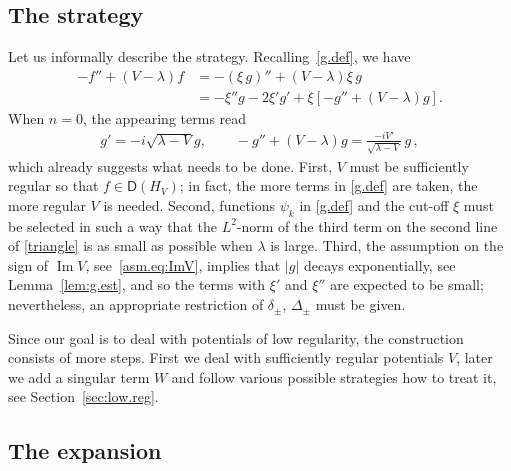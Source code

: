 \subsection{The strategy}
Let us informally describe the strategy. 
Recalling~\eqref{g.def}, we have
\begin{equation}\label{triangle}
\begin{aligned}
-f'' + (V-\lambda)f 
&= -(\xi \, g)'' + (V-\lambda)  \xi \, g
\\
&= -\xi'' g - 2 \xi' g' 
+ \xi [-g'' + (V-\lambda) g].
\end{aligned}
\end{equation}
When $n=0$, the appearing terms read
\begin{align}
g' 
= - i \sqrt{\lambda-V} g,
\qquad 
-g'' + (V-\lambda) g
= \frac{- iV'}{\sqrt{\lambda-V}} \, g
\,,
\end{align} 
which already suggests what needs to be done. First, $V$ must be sufficiently regular so that $f \in {\mathsf{D}}(H_V)$; in fact, the more terms in \eqref{g.def} are taken, the more regular $V$ is needed. Second, functions $\psi_k$ in \eqref{g.def}  and the cut-off $\xi$ must be selected in such a way that 
the $L^2$-norm of the third term on the second line of \eqref{triangle} 
is as small as possible when $\lambda$ is large. 
Third, the assumption on the sign of ${\operatorname{Im}} V$, 
see~\eqref{asm.eq:ImV}, implies that $|g|$ decays exponentially, see Lemma~\ref{lem:g.est}, and so the terms with $\xi'$ and $\xi''$ are expected to be small; nevertheless, an appropriate restriction of $\delta_\pm$, $\Delta_\pm$ must be given.

Since our goal is to deal with potentials of low regularity, the construction consists of more steps. 
First we deal with sufficiently regular potentials $V$, later we add a singular term $W$ and follow various possible strategies how to treat it, see Section~\ref{sec:low.reg}. 

\subsection{The expansion}

